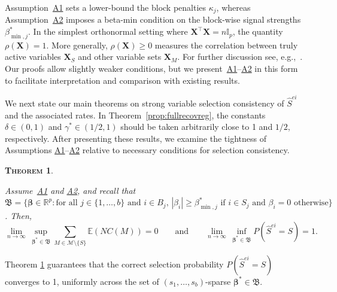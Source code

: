 \documentclass[
  12pt]{article}
\newcommand{\E}{\mathbb{E}}
\newcommand{\R}{\mathbb{R}}
\newcommand{\I}{\mathbb{I}}
\newcommand{\M}{\mathcal{M}}
\newcommand{\bbeta}{\boldsymbol{\beta}}
\newcommand{\bX}{\mathbf{X}}
\newtheorem{thm}{\textsc{Theorem}}[section]
\begin{document}
Assumption~\hyperlink{lab:A1}{A1} sets a lower-bound the block penalties $\kappa_j$, whereas Assumption~\hyperlink{lab:A2}{A2} imposes a beta-min condition on the block-wise signal strengths $\beta_{\min,j}^*$.
In the simplest orthonormal setting where $\bX^{\top}\bX=n\I_p$, the quantity $\rho(\bX)=1$. More generally, 
$\rho(\bX)\ge 0$ measures the correlation between truly active variables $\bX_S$ and other variable sets $\bX_M$. 
For further discussion see, e.g.,~\cite{infotheowainwright}.
Our proofs allow slightly weaker conditions, but we present~\hyperlink{lab:A1}{A1}--\hyperlink{lab:A2}{A2} in this form to facilitate interpretation and comparison with existing results.

We next state our main theorems on strong variable selection consistency of $\hat{S}^{ei}$ and the associated rates. In Theorem~\ref{prop:fullrecovreg}, the constants $\delta\in(0,1)$ and $\gamma^*\in(1/2,1)$ should be taken arbitrarily close to 1 and $1/2$, respectively. After presenting these results, we examine the tightness of Assumptions \hyperlink{lab:A1}{A1}–\hyperlink{lab:A2}{A2} relative to necessary conditions for selection consistency.

\begin{thm}\label{theo:suffcondlinearmodel}

Assume~\hyperlink{lab:A1}{A1} and \hyperlink{lab:A2}{A2}, and recall that $\mathfrak{B}=\{\bbeta \in \R^p: \text{for all }j \in \{1,\ldots,b\} \text{ and }i \in B_j,\, |\beta_i|\geq  \beta^*_{\min,j} \text{ if } i\in S_j \text{ and }  \beta_i= 0 \text{ otherwise}\}$. Then,
\[\lim_{n \to \infty}\, \sup_{\bbeta^*\in\mathfrak{B}}\sum_{M \in \M\setminus \{S\}}\E\left(NC(M)\right)= 0 \qquad \mbox{and} \qquad \lim_{n \to \infty}\, \inf_{\bbeta^*\in\mathfrak{B}} P(\hat{S}^{ei} = S)= 1.\]
\end{thm}

Theorem \ref{theo:suffcondlinearmodel} guarantees that the correct selection probability $P(\hat{S}^{ei} = S)$ converges to 1, uniformly across the set of $(s_1,\ldots,s_b)$-sparse $\bbeta^* \in \mathfrak{B}$.
 
\end{document}
